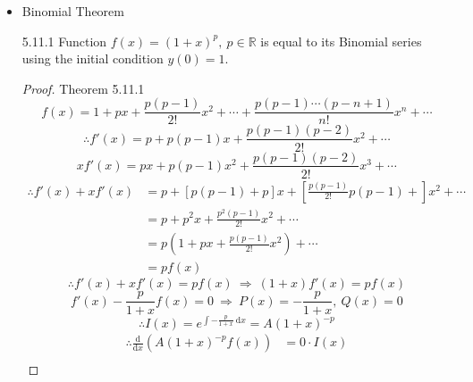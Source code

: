 \documentclass[12pt, a4paper]{article}
\def\R{{\mathbb{R}}}
\def\d{{\mathrm{d}}}
\begin{document}
\begin{enumerate}
\begin{itemize}
\begin{example}{5.11.9}{}
            \noindent\rule[0.1pt]{\textwidth}{1pt}
            \begin{center}\begin{tabular}{c|c}
                &$y(0)=1$\\
                \hline
                $y'=y^2-x$&$y'(0)=1$\\
                $y''=2yy'-1$&$y''(0)=2-1=1$\\
                $y'''=2yy''+2(y')^2$&$y'''(0)=2+2=4$\\
                $y^{(4)}=2yy'''+6y'y''$&$y^{(4)}(0)=14$\\
                $y^{(5)}=2yy^{(4)}+8y'y'''+6(y'')^2$&$y^{(5)}(0)=66$
            \end{tabular}\end{center}
        \end{example}
        \begin{example}{5.11.9 \textit{Continued}}{}
        $$\therefore P(x)=1+x+\frac{1}{2}x^2+\frac{4}{3!}x^3+\frac{14}{4!}x^4+\frac{66}{5!}x^5+\cdots$$
        \end{example}
        \item Binomial Theorem
        \begin{theorem}{5.11.1}{}
            Function $f(x)=(1+x)^p,\ p\in\R$ is equal to its Binomial series using the initial condition $y(0)=1$.
            \begin{proof}{Theorem 5.11.1}{}
                $$f(x)=1+px+\frac{p(p-1)}{2!}x^2+\cdots+\frac{p(p-1)\cdots(p-n+1)}{n!}x^n+\cdots$$
                $$\therefore f'(x)=p+p(p-1)x+\frac{p(p-1)(p-2)}{2!}x^2+\cdots$$
                $$xf'(x)=px+p(p-1)x^2+\frac{p(p-1)(p-2)}{2!}x^3+\cdots$$
                $$\begin{aligned}
                    \therefore f'(x)+xf'(x)&=p+\left[p(p-1)+p\right]x+\left[\frac{p(p-1)}{2!}p(p-1)+\right]x^2+\cdots\\
                    &=p+p^2x+\frac{p^2(p-1)}{2!}x^2+\cdots\\
                    &=p(1+px+\frac{p(p-1)}{2!}x^2)+\cdots\\
                    &=pf(x)
                \end{aligned}$$
                $$\therefore f'(x)+xf'(x)=pf(x) \ \Rightarrow\ (1+x)f'(x)=pf(x)$$
                $$f'(x)-\frac{p}{1+x}f(x)=0\ \Rightarrow\ P(x)=-\frac{p}{1+x},\ Q(x)=0$$
                $$\therefore I(x)=e^{\int -\frac{p}{1+x}\ \d x}=A(1+x)^{-p}$$
                $$\begin{aligned}
                    \therefore \frac{\d}{\d x}\left(A(1+x)^{-p}f(x)\right)&=0\cdot I(x)\\

\end{aligned}$$
\end{proof}
\end{theorem}
\end{itemize}
\end{enumerate}
\end{document}
